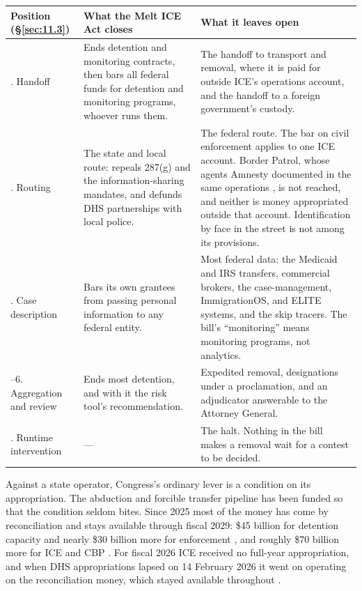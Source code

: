 \begingroup\small\renewcommand{\arraystretch}{1.12}
\begin{longtable}{@{}>{\raggedright\arraybackslash}p{}>{\raggedright\arraybackslash}p{}>{\raggedright\arraybackslash}p{}@{}}
\hline
\textbf{Position (\S\ref{sec:11.3})} & \textbf{What the Melt ICE Act closes} & \textbf{What it leaves open} \\
\hline
\endhead
8. Handoff & Ends detention and monitoring contracts, then bars all federal funds for detention and monitoring programs, whoever runs them. & The handoff to transport and removal, where it is paid for outside ICE's operations account, and the handoff to a foreign government's custody. \\ \hline
2. Routing & The state and local route: repeals 287(g) and the information-sharing mandates, and defunds DHS partnerships with local police. & The federal route. The bar on civil enforcement applies to one ICE account. Border Patrol, whose agents Amnesty documented in the same operations \autocite{Amnesty2026Whistles}, is not reached, and neither is money appropriated outside that account. Identification by face in the street is not among its provisions. \\ \hline
3. Case description & Bars its own grantees from passing personal information to any federal entity. & Most federal data: the Medicaid and IRS transfers, commercial brokers, the case-management, ImmigrationOS, and ELITE systems, and the skip tracers. The bill's “monitoring” means monitoring programs, not analytics. \\ \hline
5–6. Aggregation and review & Ends most detention, and with it the risk tool's recommendation. & Expedited removal, designations under a proclamation, and an adjudicator answerable to the Attorney General. \\ \hline
9. Runtime intervention & — & The halt. Nothing in the bill makes a removal wait for a contest to be decided. \\ \hline
\end{longtable}
\endgroup


Against a state operator, Congress's ordinary lever is a condition on its appropriation. The abduction and forcible transfer pipeline has been funded so that the condition seldom bites. Since 2025 most of the money has come by reconciliation and stays available through fiscal 2029: \$45 billion for detention capacity and nearly \$30 billion more for enforcement \autocite{obbba2025}, and roughly \$70 billion more for ICE and CBP \autocite{secureamerica2026,gao2026detention}. For fiscal 2026 ICE received no full-year appropriation, and when DHS appropriations lapsed on 14 February 2026 it went on operating on the reconciliation money, which stayed available throughout \autocite{gao2026detention}.

